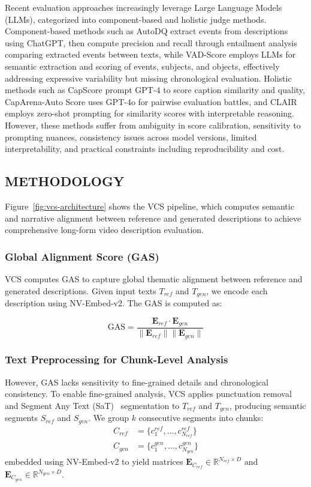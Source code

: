 \documentclass[main.tex]{subfiles}
\begin{document}
Recent evaluation approaches increasingly leverage Large Language Models (LLMs), categorized into component-based and holistic judge methods. Component-based methods such as AutoDQ \cite{wyzs:24} extract events from descriptions using ChatGPT, then compute precision and recall through entailment analysis comparing extracted events between texts, while VAD-Score employs LLMs for semantic extraction and scoring of events, subjects, and objects, effectively addressing expressive variability but missing chronological evaluation. Holistic methods such as CapScore prompt GPT-4 to score caption similarity and quality, CapArena-Auto Score uses GPT-4o for pairwise evaluation battles, and CLAIR \cite{chan:23} employs zero-shot prompting for similarity scores with interpretable reasoning. However, these methods suffer from ambiguity in score calibration, sensitivity to prompting nuances, consistency issues across model versions, limited interpretability, and practical constraints including reproducibility and cost.

\subsection{METHODOLOGY}
\label{sec:methodology_vcs}

Figure~\ref{fig:vcs-architecture} shows the VCS pipeline, which computes semantic and narrative alignment between reference and generated descriptions to achieve comprehensive long-form video description evaluation.

\subsubsection{Global Alignment Score (GAS)}
VCS computes GAS to capture global thematic alignment between reference and generated descriptions. Given input texts $T_{ref}$ and $T_{gen}$, we encode each description using NV-Embed-v2. The GAS is computed as:

\begin{equation} \label{eq:gas_revised}
\text{GAS} = \frac{\mathbf{E}_{ref} \cdot \mathbf{E}_{gen}}{\|\mathbf{E}_{ref}\| \|\mathbf{E}_{gen}\|}
\end{equation}

\subsubsection{Text Preprocessing for Chunk-Level Analysis}
However, GAS lacks sensitivity to fine-grained details and chronological consistency. To enable fine-grained analysis, VCS applies punctuation removal and Segment Any Text (SaT)~\cite{frohmann-etal-2024-segment} segmentation to $T_{ref}$ and $T_{gen}$, producing semantic segments $S_{ref}$ and $S_{gen}$. We group $k$ consecutive segments into chunks:
\begin{align}
C_{ref} &= \{c_1^{ref}, \ldots, c_{N_{ref}}^{ref}\} \\
C_{gen} &= \{c_1^{gen}, \ldots, c_{N_{gen}}^{gen}\}
\end{align}
embedded using NV-Embed-v2 to yield matrices $\mathbf{E}_{C_{ref}} \in \mathbb{R}^{N_{ref} \times D}$ and $\mathbf{E}_{C_{gen}} \in \mathbb{R}^{N_{gen} \times D}$.
\end{document}
